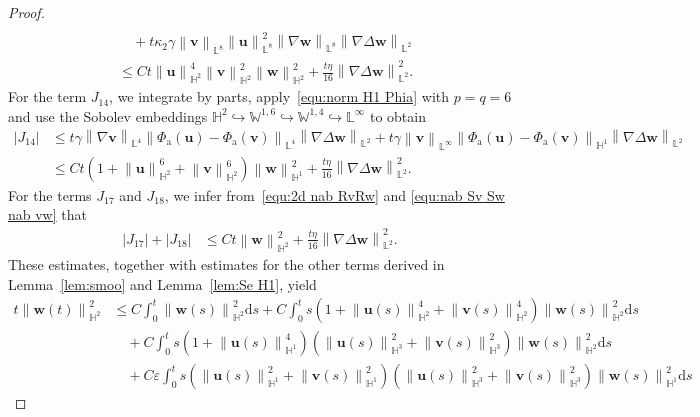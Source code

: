 \documentclass[11pt, reqno]{amsart}
\theoremstyle{definition}
\numberwithin{equation}{section}
\newcommand{\bff}{\boldsymbol}
\newcommand{\bb}{\mathbb}
\newcommand{\ds}{\mathrm{d}s}
\newcommand{\norm}[2]{\left\|{#1}\right\|_{#2}}
\newcommand{\abs}[1]{\left|{#1}\right|}
\begin{document}
\begin{proof}
\begin{align*}
    \\
    &\quad
    +
    t\kappa_2 \gamma \norm{\bff{v}}{\bb{L}^8} \norm{\bff{u}}{\bb{L}^8}^2 \norm{\nabla \bff{w}}{\bb{L}^8} \norm{\nabla\Delta \bff{w}}{\bb{L}^2}
    \\
    &\leq
    Ct \norm{\bff{u}}{\bb{H}^2}^4 \norm{\bff{v}}{\bb{H}^2}^2 \norm{\bff{w}}{\bb{H}^2}^2
    +
    \frac{t\eta}{16} \norm{\nabla \Delta \bff{w}}{\bb{L}^2}^2.
\end{align*}
For the term $J_{14}$, we integrate by parts, apply~\eqref{equ:norm H1 Phia} with $p=q=6$ and use the Sobolev embeddings $\bb{H}^2\hookrightarrow \bb{W}^{1,6}\hookrightarrow \bb{W}^{1,4} \hookrightarrow \bb{L}^\infty$ to obtain
\begin{align*}
    \abs{J_{14}}
    &\leq
    t\gamma \norm{\nabla \bff{v}}{\bb{L}^4} \norm{\Phi_{\mathrm{a}}(\bff{u})-\Phi_{\mathrm{a}}(\bff{v})}{\bb{L}^4} \norm{\nabla\Delta \bff{w}}{\bb{L}^2}
    +
    t\gamma \norm{\bff{v}}{\bb{L}^\infty} \norm{\Phi_{\mathrm{a}}(\bff{u})-\Phi_{\mathrm{a}}(\bff{v})}{\bb{H}^1} \norm{\nabla\Delta \bff{w}}{\bb{L}^2}
    \\
    &\leq
    Ct \left(1+ \norm{\bff{u}}{\bb{H}^2}^6 + \norm{\bff{v}}{\bb{H}^2}^6\right) \norm{\bff{w}}{\bb{H}^1}^2 
    +
    \frac{t\eta}{16} \norm{\nabla \Delta \bff{w}}{\bb{L}^2}^2.
\end{align*}
For the terms $J_{17}$ and $J_{18}$, we infer from~\eqref{equ:2d nab RvRw} and \eqref{equ:nab Sv Sw nab vw} that
\begin{align*}
    \abs{J_{17}}+ \abs{J_{18}}
    &\leq
    Ct \norm{\bff{w}}{\bb{H}^2}^2 
    +
    \frac{t\eta}{16} \norm{\nabla \Delta \bff{w}}{\bb{L}^2}^2.
\end{align*}
These estimates, together with estimates for the other terms derived in Lemma~\ref{lem:smoo} and Lemma~\ref{lem:Se H1}, yield
\begin{align*}
    t \norm{\bff{w}(t)}{\bb{H}^2}^2
    &\leq
    C \int_0^t \norm{\bff{w}(s)}{\bb{H}^2}^2 \ds
    +
    C \int_0^t s \left(1+\norm{\bff{u}(s)}{\bb{H}^2}^4+ \norm{\bff{v}(s)}{\bb{H}^2}^4 \right) \norm{\bff{w}(s)}{\bb{H}^2}^2 \ds
    \\
    &\quad
    +
    C \int_0^t s \left(1+ \norm{\bff{u}(s)}{\bb{H}^1}^4 \right) \left(\norm{\bff{u}(s)}{\bb{H}^3}^2 + \norm{\bff{v}(s)}{\bb{H}^3}^2\right) \norm{\bff{w}(s)}{\bb{H}^2}^2 \ds 
    \\
    &\quad
    +
    C\varepsilon \int_0^t s \left(\norm{\bff{u}(s)}{\bb{H}^1}^2 + \norm{\bff{v}(s)}{\bb{H}^1}^2 \right) \left(\norm{\bff{u}(s)}{\bb{H}^3}^2 + \norm{\bff{v}(s)}{\bb{H}^3}^2 \right) \norm{\bff{w}(s)}{\bb{H}^1}^2 \ds

\end{align*}
\end{proof}
\end{document}
